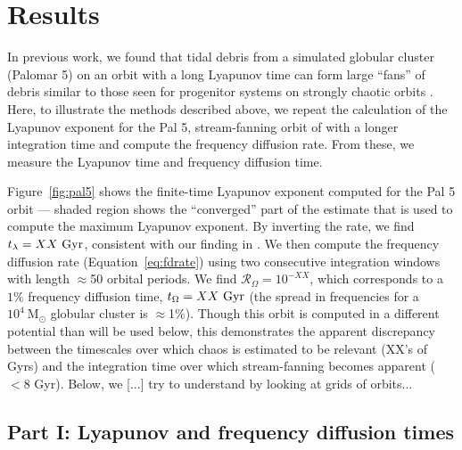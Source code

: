 \documentclass[letterpaper,12pt,preprint]{aastex}
\newcommand{\msun}{\ensuremath{\mathrm{M}_\odot}}
\newcommand{\fdrate}{\mathcal{R}_\Omega}
\begin{document}
%
\section{Results}

In previous work, we found that tidal debris from a simulated globular cluster (Palomar 5) on an orbit with a long Lyapunov time can form large ``fans'' of debris similar to those seen for progenitor systems on strongly chaotic orbits \citep{pearson15, fardal14}. Here, to illustrate the methods described above, we repeat the calculation of the Lyapunov exponent for the Pal 5, stream-fanning orbit of \cite{pearson15} with a longer integration time and compute the frequency diffusion rate. From these, we measure the Lyapunov time and frequency diffusion time. 

Figure~\ref{fig:pal5} shows the finite-time Lyapunov exponent computed for the Pal 5 orbit --- shaded region shows the ``converged'' part of the estimate that is used to compute the maximum Lyapunov exponent. By inverting the rate, we find $t_\lambda = XX~{\rm Gyr}$, consistent with our finding in \cite{pearson15}. We then compute the frequency diffusion rate (Equation~\ref{eq:fdrate}) using two consecutive integration windows with length $\approx$50 orbital periods. We find $\fdrate = 10^{-XX}$, which corresponds to a $1\%$ frequency diffusion time, $t_\Omega = XX~{\rm Gyr}$ (the spread in frequencies for a $10^4~\msun$ globular cluster is $\approx$1\%). Though this orbit is computed in a different potential than will be used below, this demonstrates the apparent discrepancy between the timescales over which chaos is estimated to be relevant (XX's of Gyrs) and the integration time over which stream-fanning becomes apparent ($<8$ Gyr). Below, we [...] try to understand by looking at grids of orbits...

\subsection{Part I: Lyapunov and frequency diffusion times}\label{sec:results1}
\end{document}
